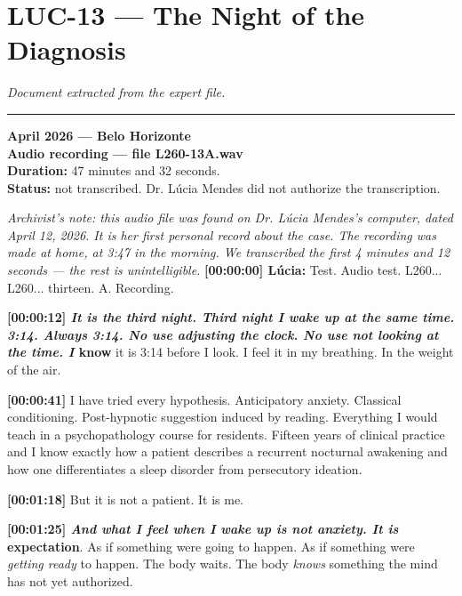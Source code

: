 \section*{\textbf{LUC-13} --- The Night of the Diagnosis}

\noindent \textit{Document extracted from the expert file.}

\vspace{0.5em}\noindent\rule{\textwidth}{0.5pt}\vspace{0.5em}


\noindent \textbf{April 2026 --- Belo Horizonte}\\
\noindent \textbf{Audio recording --- file L260-13A.wav}\\
\noindent \textbf{Duration:} 47 minutes and 32 seconds.\\
\noindent \textbf{Status:} not transcribed. Dr. Lúcia Mendes did not authorize the transcription.

\noindent \textit{Archivist's note: this audio file was found on Dr. Lúcia Mendes's computer, dated April 12, 2026. It is her first personal record about the case. The recording was made at home, at 3:47 in the morning. We transcribed the first 4 minutes and 12 seconds --- the rest is unintelligible.}
\noindent \textbf{[00:00:00] Lúcia:} Test. Audio test. L260... L260... thirteen. A. Recording.

\noindent \textbf{[00:00:12]\textit{ It is the third night. Third night I wake up at the same time. 3:14. Always 3:14. No use adjusting the clock. No use not looking at the time. I }know} it is 3:14 before I look. I feel it in my breathing. In the weight of the air.

\noindent \textbf{[00:00:41]} I have tried every hypothesis. Anticipatory anxiety. Classical conditioning. Post-hypnotic suggestion induced by reading. Everything I would teach in a psychopathology course for residents. Fifteen years of clinical practice and I know exactly how a patient describes a recurrent nocturnal awakening and how one differentiates a sleep disorder from persecutory ideation.

\noindent \textbf{[00:01:18]} But it is not a patient. It is me.

\noindent \textbf{[00:01:25]\textit{ And what I feel when I wake up is not anxiety. It is }expectation}. As if something were going to happen. As if something were \textit{getting ready} to happen. The body waits. The body \textit{knows} something the mind has not yet authorized.

